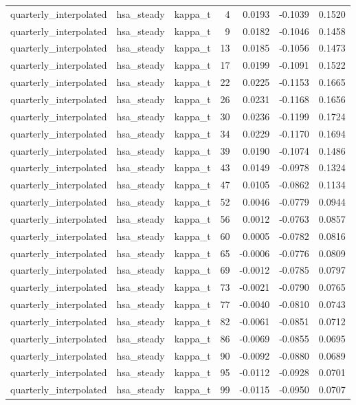 \begin{tabular}{lllrrrr}
quarterly\_interpolated & hsa\_steady & kappa\_t & 4 & 0.0193 & -0.1039 & 0.1520 \\
quarterly\_interpolated & hsa\_steady & kappa\_t & 9 & 0.0182 & -0.1046 & 0.1458 \\
quarterly\_interpolated & hsa\_steady & kappa\_t & 13 & 0.0185 & -0.1056 & 0.1473 \\
quarterly\_interpolated & hsa\_steady & kappa\_t & 17 & 0.0199 & -0.1091 & 0.1522 \\
quarterly\_interpolated & hsa\_steady & kappa\_t & 22 & 0.0225 & -0.1153 & 0.1665 \\
quarterly\_interpolated & hsa\_steady & kappa\_t & 26 & 0.0231 & -0.1168 & 0.1656 \\
quarterly\_interpolated & hsa\_steady & kappa\_t & 30 & 0.0236 & -0.1199 & 0.1724 \\
quarterly\_interpolated & hsa\_steady & kappa\_t & 34 & 0.0229 & -0.1170 & 0.1694 \\
quarterly\_interpolated & hsa\_steady & kappa\_t & 39 & 0.0190 & -0.1074 & 0.1486 \\
quarterly\_interpolated & hsa\_steady & kappa\_t & 43 & 0.0149 & -0.0978 & 0.1324 \\
quarterly\_interpolated & hsa\_steady & kappa\_t & 47 & 0.0105 & -0.0862 & 0.1134 \\
quarterly\_interpolated & hsa\_steady & kappa\_t & 52 & 0.0046 & -0.0779 & 0.0944 \\
quarterly\_interpolated & hsa\_steady & kappa\_t & 56 & 0.0012 & -0.0763 & 0.0857 \\
quarterly\_interpolated & hsa\_steady & kappa\_t & 60 & 0.0005 & -0.0782 & 0.0816 \\
quarterly\_interpolated & hsa\_steady & kappa\_t & 65 & -0.0006 & -0.0776 & 0.0809 \\
quarterly\_interpolated & hsa\_steady & kappa\_t & 69 & -0.0012 & -0.0785 & 0.0797 \\
quarterly\_interpolated & hsa\_steady & kappa\_t & 73 & -0.0021 & -0.0790 & 0.0765 \\
quarterly\_interpolated & hsa\_steady & kappa\_t & 77 & -0.0040 & -0.0810 & 0.0743 \\
quarterly\_interpolated & hsa\_steady & kappa\_t & 82 & -0.0061 & -0.0851 & 0.0712 \\
quarterly\_interpolated & hsa\_steady & kappa\_t & 86 & -0.0069 & -0.0855 & 0.0695 \\
quarterly\_interpolated & hsa\_steady & kappa\_t & 90 & -0.0092 & -0.0880 & 0.0689 \\
quarterly\_interpolated & hsa\_steady & kappa\_t & 95 & -0.0112 & -0.0928 & 0.0701 \\
quarterly\_interpolated & hsa\_steady & kappa\_t & 99 & -0.0115 & -0.0950 & 0.0707 \\
\bottomrule
\end{tabular}
